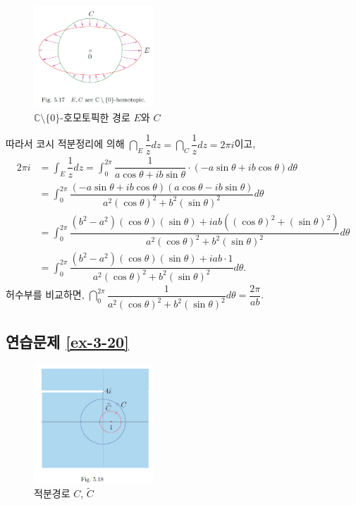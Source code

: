\begin{figure}[h!]
\begin{center}
\includegraphics[width=0.4\textwidth]{./Solution/figs/fig-5-17}
\end{center}
\caption{$\mathbb C\setminus \{0\}$-호모토픽한 경로 $E$와 $C$}
\label{fig-5-17}
\end{figure}

따라서 코시 적분정리에 의해 $\dint_E \dfrac 1z dz = \dint_C \dfrac1z dz = 2\pi i$이고,
\begin{align*}
2\pi i &= \int_E \dfrac 1z dz = \int_0^{2\pi} \dfrac1{a\cos\theta +i b\sin\theta}
\cdot(-a\sin\theta + ib\cos\theta)d\theta \\
&= \int_0^{2\pi} \dfrac{(-a\sin\theta +ib\cos\theta)(a\cos\theta -ib\sin\theta)}
{a^2(\cos\theta)^2 + b^2(\sin\theta)^2}d\theta \\
&= \int_0^{2\pi} \dfrac{(b^2-a^2)(\cos\theta)(\sin\theta)+iab((\cos\theta)^2+(\sin\theta)^2)}
{a^2(\cos\theta)^2 + b^2(\sin\theta)^2}d\theta \\
&= \int_0^{2\pi} \dfrac{(b^2-a^2)(\cos\theta)(\sin\theta)+iab\cdot 1}
{a^2(\cos\theta)^2 + b^2(\sin\theta)^2}d\theta.
\end{align*}
허수부를 비교하면,
$\dint_0^{2\pi} \dfrac1{a^2(\cos\theta)^2 + b^2(\sin\theta)^2}d\theta = \dfrac{2\pi}{ab}$.

\subsection*{연습문제 \ref{ex-3-20}}

\begin{figure}[h!]
\begin{center}
\includegraphics[width=0.4\textwidth]{./Solution/figs/fig-5-18}
\end{center}
\caption{적분경로 $C$, $\tilde C$}
\label{fig-5-18}
\end{figure}

